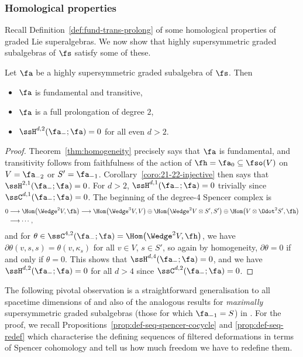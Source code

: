 \subsubsection{Homological properties}

Recall Definition~\ref{def:fund-trans-prolong} of some homological properties of graded Lie superalgebras. We now show that highly supersymmetric graded subalgebras of $\fs$ satisfy some of these.

\begin{Lemma}\label{lemma:high-susy-subalg-coho}
	Let $\fa$ be a highly supersymmetric graded subalgebra of $\fs$. Then
	\begin{itemize}\itemsep=0pt
	\item $\fa$ is fundamental and transitive,
	\item $\fa$ is a full prolongation of degree $2$,
	\item $\ssH^{d,2}(\fa_-;\fa)=0$ for all even $d>2$.
	\end{itemize}
\end{Lemma}
\begin{proof}
	Theorem~\ref{thm:homogeneity} precisely says that $\fa$ is fundamental, and transitivity follows from faithfulness of the action of $\fh=\fa_0\subseteq\fso(V)$ on $V=\fa_{-2}$ or $S'=\fa_{-1}$. Corollary~\ref{coro:21-22-injective} then says that~${\ssH^{2,1}(\fa_-;\fa)=0}$. For $d>2$, $\ssH^{d,1}(\fa_-;\fa)=0$ trivially since $\ssC^{d,1}(\fa_-;\fa)=0$. The beginning of the degree-4 Spencer complex is
	\begin{align*}%
		0	&\longrightarrow \Hom\bigl(\Wedge^2V,\fh\bigr)	
			\longrightarrow \Hom\bigl(\Wedge^3 V,V\bigr)\oplus \Hom\bigl(\Wedge^2V\otimes S',S'\bigr) \oplus \Hom\bigl(V\otimes \Odot^2 S', \fh\bigr) \\
&\longrightarrow \cdots,
	\end{align*}
	and for $\theta\in \ssC^{4,2}(\fa_-;\fa)=\Hom\bigl(\Wedge^2V,\fh\bigr)$, we have
$\partial\theta (v,s,s) = \theta(v,\kappa_s)$
	for all $v\in V$, $s\in S'$, so again by homogeneity, $\partial\theta=0$ if and only if $\theta=0$. This shows that $\ssH^{d,4}(\fa_-;\fa)=0$, and we have~${\ssH^{d,2}(\fa_-;\fa)=0}$ for all $d>4$ since $\ssC^{d,2}(\fa_-;\fa)=0$.
\end{proof}

The following pivotal observation is a straightforward generalisation to all spacetime dimensions of \cite[Proposition 6]{Figueroa-OFarrill2017_1} and also of the analogous results for \emph{maximally} supersymmetric graded subalgebras (those for which $\fa_{-1}=S$) in \cite{deMedeiros2016,Figueroa-OFarrill2017}. For the proof, we recall Propositions~\ref{prop:def-seq-spencer-cocycle} and \ref{prop:def-seq-redef} which characterise the defining sequences of filtered deformations in terms of Spencer cohomology and tell us how much freedom we have to redefine them.

